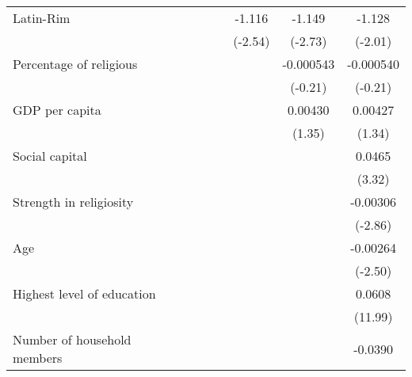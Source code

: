 {\begin{tabular}{l*{6}{c}}
Latin-Rim       &                  &                  &                  &   -1.116\sym{*}  &   -1.149\sym{**} &   -1.128\sym{*}  \\
                &                  &                  &                  &  (-2.54)         &  (-2.73)         &  (-2.01)         \\
Percentage of religious&                  &                  &                  &                  &-0.000543         &-0.000540         \\
                &                  &                  &                  &                  &  (-0.21)         &  (-0.21)         \\
GDP per capita  &                  &                  &                  &                  &  0.00430         &  0.00427         \\
                &                  &                  &                  &                  &   (1.35)         &   (1.34)         \\
Social capital  &                  &                  &                  &                  &                  &   0.0465\sym{***}\\
                &                  &                  &                  &                  &                  &   (3.32)         \\
Strength in religiosity&                  &                  &                  &                  &                  & -0.00306\sym{**} \\
                &                  &                  &                  &                  &                  &  (-2.86)         \\
Age             &                  &                  &                  &                  &                  & -0.00264\sym{*}  \\
                &                  &                  &                  &                  &                  &  (-2.50)         \\
Highest level of education&                  &                  &                  &                  &                  &   0.0608\sym{***}\\
                &                  &                  &                  &                  &                  &  (11.99)         \\
Number of household members&                  &                  &                  &                  &                  &  -0.0390\sym{*}  \\

\end{tabular}}
